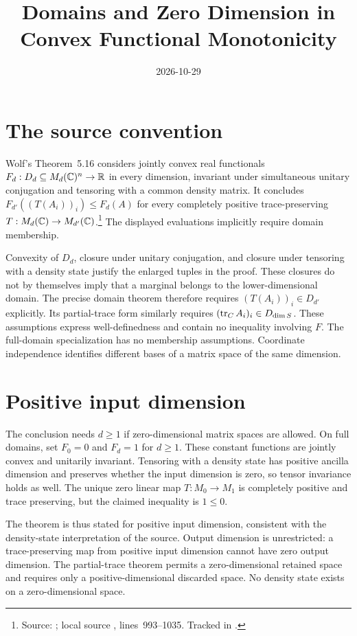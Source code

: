 \documentclass{article}
\title{Domains and Zero Dimension in Convex Functional Monotonicity}
\author{}
\date{2026-10-29}
\begin{document}
\maketitle
{}

\section{The source convention}

Wolf's Theorem~5.16 considers jointly convex real functionals
$F_d:D_d\subseteq M_{d}(\mathbb{C})^n\to\mathbb R$ in every dimension, invariant under
simultaneous unitary conjugation and tensoring with a common density matrix.
It concludes $F_{d'}((T(A_i))_i)\le F_d(A)$ for every completely positive
trace-preserving $T:M_{d}(\mathbb{C})\to M_{d'}(\mathbb{C})$.\footnote{Source:
\cite[Theorem~5.16, Equations~(5.49)--(5.50)]{Wolf2012Quantum}; local source
, lines~993--1035.
Tracked in .}
The displayed evaluations implicitly require domain membership.

Convexity of $D_d$, closure under unitary conjugation, and closure under
tensoring with a density state justify the enlarged tuples in the proof.
These closures do not by themselves imply that a marginal belongs to the
lower-dimensional domain. The precise domain theorem therefore requires
$(T(A_i))_i\in D_{d'}$ explicitly. Its partial-trace form similarly requires
$(\operatorname{tr}_C A_i)_i\in D_{\dim S}$. These assumptions express well-definedness
and contain no inequality involving $F$. The full-domain specialization has
no membership assumptions. Coordinate independence identifies different
bases of a matrix space of the same dimension.

\section{Positive input dimension}

The conclusion needs $d\ge1$ if zero-dimensional matrix spaces are allowed.
On full domains, set $F_0=0$ and $F_d=1$ for $d\ge1$. These constant
functions are jointly convex and unitarily invariant. Tensoring with a
density state has positive ancilla dimension and preserves whether the
input dimension is zero, so tensor invariance holds as well.
The unique zero linear map $T:M_0\to M_1$ is completely positive and trace
preserving, but the claimed inequality is $1\le0$.

The theorem is thus stated for positive input dimension, consistent with
the density-state interpretation of the source. Output dimension is unrestricted:
a trace-preserving map from positive input dimension cannot have zero output
dimension. The partial-trace theorem permits a zero-dimensional retained
space and requires only a positive-dimensional discarded space. No density
state exists on a zero-dimensional space.
\end{document}
